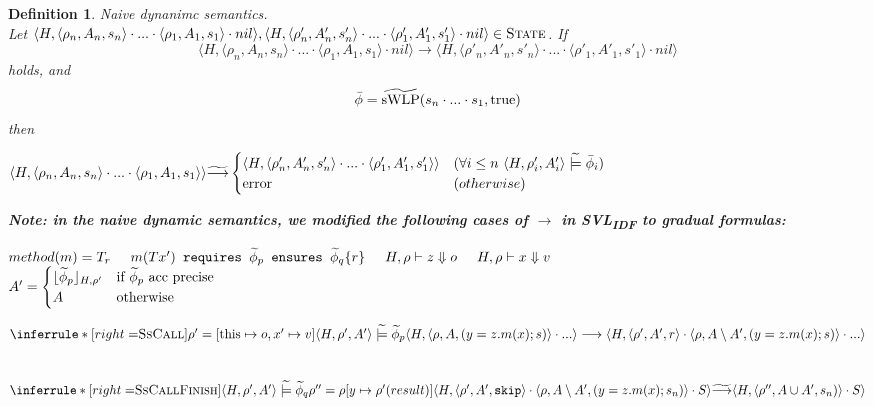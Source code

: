 \documentclass {article}
\newtheorem{definition}[theorem]{Definition}
\newcommand{\true}{\text{true}}
\newcommand{\tphi}{\widetilde{\phi}}
\newcommand{\tconsistent}{\hspace{1mm}\widetilde{\models}\hspace{1mm}}
\newcommand{\tswlp}[2]{\widetilde{\textup{sWLP}}(#1,#2)}
\newcommand{\error}{\text{error}}
\begin{document}
\begin{definition} Naive dynanimc semantics.\\
Let $\langle H,\langle \rho_n, A_n, s_n\rangle \cdot ... \cdot \langle \rho_1, A_1, s_1\rangle \cdot nil \rangle, \langle H,\langle \rho'_n, A'_n, s'_n\rangle \cdot ... \cdot \langle \rho'_1, A'_1, s'_1\rangle \cdot nil \rangle \in \textsc{State}$. If $$\langle H,\langle \rho_n, A_n, s_n\rangle \cdot ... \cdot \langle \rho_1, A_1, s_1\rangle \cdot nil \rangle \longrightarrow \langle H,\langle \rho'_n, A'_n, s'_n\rangle \cdot ... \cdot \langle \rho'_1, A'_1, s'_1\rangle \cdot nil\rangle$$ holds, and $$\bar{\phi} = \tswlp{s_n \cdot ... \cdot s_1}{\true}$$ then\\
\begin{center}
$  \langle H,\langle \rho_n, A_n, s_n\rangle \cdot ... \cdot \langle \rho_1, A_1, s_1\rangle \rangle \widetilde{\longrightarrow}
\begin{cases}
     \langle H,\langle \rho'_n, A'_n, s'_n\rangle \cdot ... \cdot \langle \rho'_1, A'_1, s'_1\rangle \rangle & (\forall i \leq n \text{ }\langle H, \rho'_i, A'_i \rangle \tconsistent \bar{\phi}_i)\\
     \error &(otherwise)
\end{cases}
$
\end{center}
\textbf{\textup{Note: in the naive dynamic semantics, we modified the following cases of $\longrightarrow$ in \textup{SVL\textsubscript{IDF}} to gradual formulas:}}
\begin{center}
$method(m) = T_r \hspace{5mm} m(T x') \texttt{\textup{ requires }} \tphi_p \texttt{\textup{ ensures }} \tphi_q \{r\} \hspace{5mm} H,\rho \vdash z \Downarrow o \hspace{5mm} H,\rho \vdash x \Downarrow v$\\
$A' = \begin{cases} \lfloor \tphi_p \rfloor_{H,\rho'} &\textup{if } \tphi_p \textup{ acc precise} \\ A &\textup{otherwise} \end{cases}$ 
\end{center}
\[ \inferrule*[right=$\textsc{SsCall}$]
    {\rho' = [\textup{this} \mapsto o, x' \mapsto v]\\ \langle H, \rho', A' \rangle \tconsistent \tphi_p}
    {\langle H, \langle \rho, A, (y = z.m(x);s)\rangle \cdot ...\rangle \longrightarrow {\langle H, \langle \rho', A', r\rangle \cdot \langle \rho, A \setminus A', (y = z.m(x);s)\rangle \cdot ...\rangle}
}
\]\\
\[ \inferrule*[right=$\textsc{SsCallFinish}$]
    { \langle H, \rho', A' \rangle \tconsistent \tphi_q \\ \rho'' = \rho[y \mapsto \rho'(result)]}
    { {\langle H, \langle \rho', A', \texttt{\textup{skip}} \rangle \cdot \langle \rho, A \setminus A', (y = z.m(x);s_n)\rangle \cdot S\rangle \widetilde{\longrightarrow}\langle H, \langle \rho'', A \cup A', s_n)\rangle \cdot S\rangle}}
\]
\end{definition}
\end{document}
